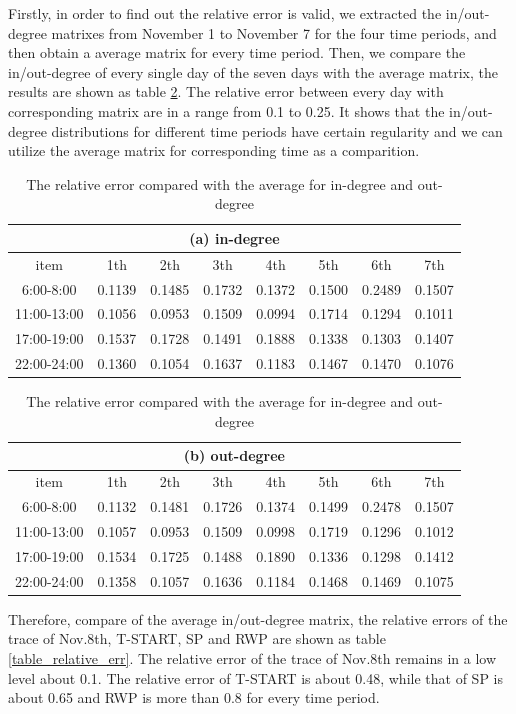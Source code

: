 Firstly, in order to find out the relative error is valid, we extracted the in/out-degree matrixes from November 1 to November 7 for the four time periods, and then obtain a average matrix for every time period. Then, we compare the in/out-degree of every single day of the seven days with the average matrix, the results are shown as table \ref{table_relative_err_avg}. The relative error between every day with corresponding matrix are in a range from 0.1 to 0.25. It shows that the in/out-degree distributions for different time periods have certain regularity and we can utilize the average matrix for corresponding time as a comparition. 
\begin{table}[!t]
\centering
\caption{The relative error compared with the average for in-degree and out-degree}\label{table_relative_err_avg}
\begin{tabular}[c]{c|c|c|c|c|c|c|c}
\multicolumn{8}{c}{(a) in-degree}\\
\hline
item& 1th&2th&3th&4th&5th&6th&7th\\
\hline
6:00-8:00&
0.1139& 
0.1485&
0.1732&
0.1372&
0.1500&
0.2489&
0.1507\\
11:00-13:00&
0.1056&
0.0953&
0.1509&
0.0994&
0.1714&
0.1294&
0.1011\\
17:00-19:00&
0.1537&
0.1728&
0.1491&
0.1888&
0.1338&
0.1303&
0.1407\\
22:00-24:00&
0.1360&
0.1054&
0.1637&
0.1183&
0.1467&
0.1470&
0.1076\\
\hline
\end{tabular}
\begin{tabular}[c]{c|c|c|c|c|c|c|c}
\multicolumn{8}{c}{(b) out-degree}\\
\hline
item& 1th&2th&3th&4th&5th&6th&7th\\
\hline
6:00-8:00&
0.1132&
0.1481&
0.1726&
0.1374&
0.1499&
0.2478&
0.1507\\
11:00-13:00&
0.1057&
0.0953&
0.1509&
0.0998&
0.1719&
0.1296&
0.1012\\
17:00-19:00&
0.1534&
0.1725&
0.1488&
0.1890&
0.1336&
0.1298&
0.1412\\
22:00-24:00&
0.1358&
0.1057&
0.1636&
0.1184&
0.1468&
0.1469&
0.1075\\
\hline
\end{tabular}
\end{table}
Therefore, compare of the average in/out-degree matrix, the relative errors of the trace of Nov.8th, T-START, SP and RWP are shown as table \ref{table_relative_err}.
The relative error of the trace of Nov.8th remains in a low level about 0.1.
The relative error of T-START is about 0.48, while that of SP is about 0.65 and RWP is more than 0.8 for every time period.  

